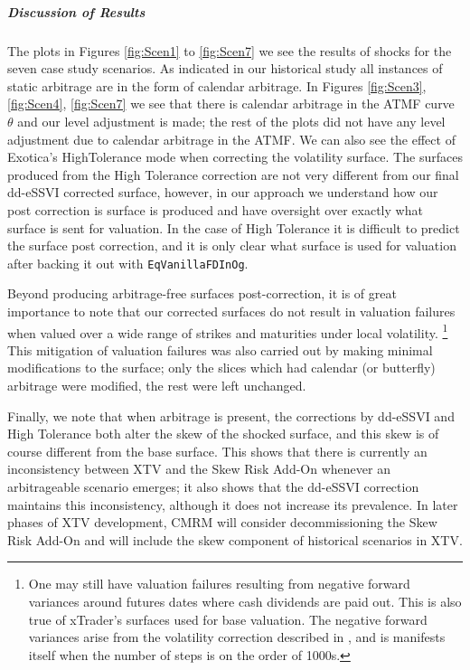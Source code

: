 \documentclass[11pt,letterpaper]{article}
\begin{document}
\subparagraph{Discussion of Results}

The plots in Figures \ref{fig:Scen1} to \ref{fig:Scen7} we see the results of shocks for the seven case study scenarios. As indicated in our historical study all instances of static arbitrage are in the form of calendar arbitrage. In Figures \ref{fig:Scen3}, \ref{fig:Scen4}, \ref{fig:Scen7} we see that there is calendar arbitrage in the ATMF curve $\theta$ and our level adjustment is made; the rest of the plots did not have any level adjustment due to calendar arbitrage in the ATMF. We can also see the effect of Exotica's HighTolerance mode when correcting the volatility surface. The surfaces produced from the High Tolerance correction are not very different from our final dd-eSSVI corrected surface, however, in our approach we understand how our post correction is surface is produced and have oversight over exactly what surface is sent for valuation. In the case of High Tolerance it is difficult to predict the surface post correction, and it is only clear what surface is used for valuation after backing it out with \texttt{EqVanillaFDInOg}.


Beyond producing arbitrage-free surfaces post-correction, it is of great importance to note that our corrected surfaces do not result in valuation failures when valued over a wide range of strikes and maturities under local volatility. \footnote{One may still have valuation failures resulting from negative forward variances around futures dates where cash dividends are paid out. This is also true of xTrader's surfaces used for base valuation. The negative forward variances arise from the volatility correction described in \cite{gqa_localvol}, and is manifests itself when the number of steps is on the order of 1000s.} This mitigation of valuation failures was also carried out by making minimal modifications to the surface; only the slices which had calendar (or butterfly) arbitrage were modified, the rest were left unchanged. 

Finally, we note that when arbitrage is present, the corrections by dd-eSSVI and High Tolerance both alter the skew of the shocked surface, and this skew is of course different from the base surface. This shows that there is currently an inconsistency between XTV and the Skew Risk Add-On whenever an arbitrageable scenario emerges; it also shows that the dd-eSSVI correction maintains this inconsistency, although it does not increase its prevalence. In later phases of XTV development, CMRM will consider decommissioning the Skew Risk Add-On and will include the skew component of historical scenarios in XTV. 
\end{document}
